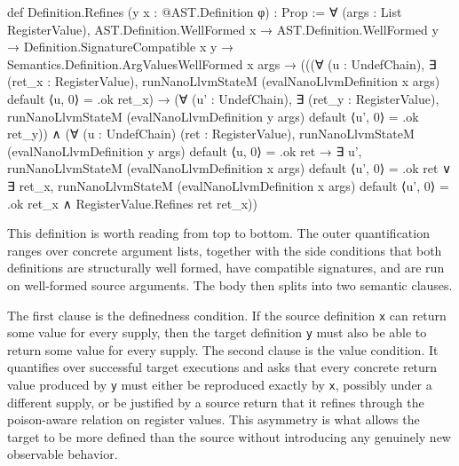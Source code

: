 \small
\begin{leanlisting}
def Definition.Refines (y x : @AST.Definition φ) : Prop :=
  ∀ (args : List RegisterValue),
    AST.Definition.WellFormed x →
    AST.Definition.WellFormed y →
    Definition.SignatureCompatible x y →
    Semantics.Definition.ArgValuesWellFormed x args →
    (((∀ (u : UndefChain), ∃ (ret_x : RegisterValue),
        runNanoLlvmStateM (evalNanoLlvmDefinition x args) default ⟨u, 0⟩ = .ok ret_x) →
      (∀ (u' : UndefChain), ∃ (ret_y : RegisterValue),
        runNanoLlvmStateM (evalNanoLlvmDefinition y args) default ⟨u', 0⟩ = .ok ret_y)) ∧
      (∀ (u : UndefChain) (ret : RegisterValue),
        runNanoLlvmStateM (evalNanoLlvmDefinition y args) default ⟨u, 0⟩ = .ok ret →
        ∃ u',
          runNanoLlvmStateM (evalNanoLlvmDefinition x args) default ⟨u', 0⟩ = .ok ret ∨
            ∃ ret_x,
              runNanoLlvmStateM (evalNanoLlvmDefinition x args) default ⟨u', 0⟩ = .ok ret_x ∧
                RegisterValue.Refines ret ret_x))
\end{leanlisting}
\normalsize

This definition is worth reading from top to bottom. The outer quantification
ranges over concrete argument lists, together with the side conditions that
both definitions are structurally well formed, have compatible signatures, and
are run on well-formed source arguments. The body then splits into two
semantic clauses.

The first clause is the definedness condition. If the source definition
\texttt{x} can return some value for every \vundef supply, then the target
definition \texttt{y} must also be able to return some value for every
\vundef supply. The second clause is the value condition. It quantifies over
successful target executions and asks that every concrete return value
produced by \texttt{y} must either be reproduced exactly by \texttt{x},
possibly under a different \vundef supply, or be justified by a source return
that it refines through the poison-aware relation on register values. This
asymmetry is what allows the target to be more defined than the source
without introducing any genuinely new observable behavior.
